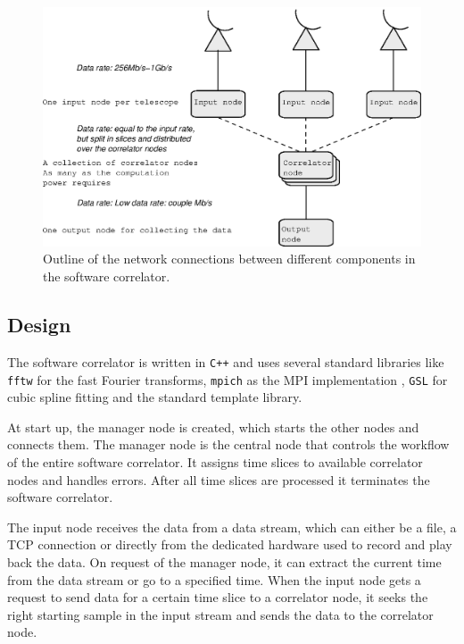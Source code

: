 \begin{figure}
  \centering
  \includegraphics[width=.75\textwidth]
    {img/Network_correlator}
    \caption{Outline of the network connections between different
      components in the software correlator.}
  \label{fig:netw_corr}
\end{figure}


\subsection{Design}
The software correlator is written in \verb~C++~ and uses several
standard libraries like \verb~fftw~ \cite{FFTW05} for the fast Fourier
transforms, \verb~mpich~ \cite{Gropp:1996:HPI} as the MPI
implementation , \verb~GSL~ \cite{GSL} for cubic spline fitting and
the standard template library.

At start up, the manager node is created, which starts the other nodes
and connects them. The manager node is the central node that controls
the workflow of the entire software correlator. It assigns time slices
to available correlator nodes and handles errors. After all time
slices are processed it terminates the software correlator.

The input node receives the data from a data stream, which can either
be a file, a TCP connection or directly from the dedicated hardware
used to record and play back the data. On request of the manager node,
it can extract the current time from the data stream or go to a
specified time. When the input node gets a request to send data for a
certain time slice to a correlator node, it seeks the right starting
sample in the input stream and sends the data to the correlator node.

